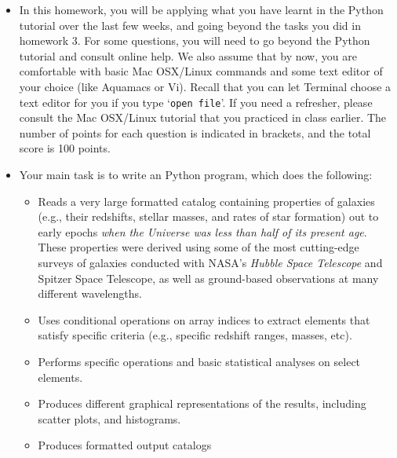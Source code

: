 \documentclass[11pt]{article}    %
\begin{document}
\begin{itemize}
\item 
\noindent
In this homework, you will be applying what you have learnt in the
Python tutorial over the last few weeks, and going beyond the tasks
you did in homework 3.  For some questions, you will need
to go beyond the Python tutorial and consult online help. 
We also assume that by now, you are comfortable with basic Mac 
OSX/Linux commands and some text editor of your choice (like
Aquamacs or Vi). Recall that you can let Terminal choose a text editor
for you if you type `{\tt{open file}}'. If you need a refresher, please consult
the Mac OSX/Linux tutorial that you practiced in class earlier.
The number of points for each question is indicated in brackets,
and the total score is 100 points.

\item 
\noindent
Your main task is to write an Python program, which does the following: 

\vspace{-3mm}
\begin{itemize}
\item 
\noindent
Reads a  very large formatted catalog containing properties
of galaxies (e.g., their redshifts, stellar masses,  and rates of star
formation) out  to early epochs  {\it {when the Universe was less than 
half of its present age}}.
These properties were  derived using some of the most
cutting-edge surveys of galaxies conducted with NASA's 
{\it {Hubble Space Telescope}}  and   Spitzer Space Telescope,
as well as  ground-based observations at many different wavelengths.

\item 
\noindent 
Uses conditional operations on array indices to extract elements 
that satisfy specific criteria  (e.g., specific redshift ranges,
masses,  etc).

\item  
\noindent 
Performs specific operations and basic statistical analyses on select 
elements.


\item  
\noindent 
Produces different graphical representations of the results, including 
scatter plots, and  histograms.

\item  
\noindent 
Produces formatted output catalogs

\end{itemize}
\end{itemize}
\end{document}
